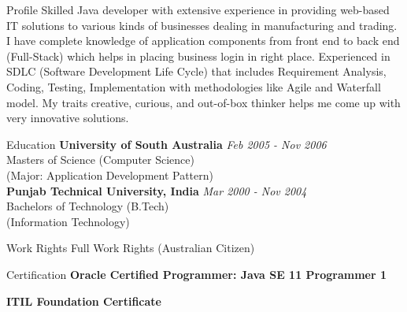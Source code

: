 \documentclass{resume}
\begin{document}
\begin{rSection}{Profile}
Skilled Java developer with extensive experience in providing web-based IT solutions to various kinds of businesses dealing in manufacturing and trading. I have complete knowledge of application components from front end to back end (Full-Stack) which helps in placing business login in right place. Experienced in SDLC (Software Development Life Cycle) that includes Requirement Analysis, Coding, Testing, Implementation with methodologies like Agile and Waterfall model. My traits creative, curious, and out-of-box thinker helps me come up with very innovative solutions. 
\end{rSection}

\begin{rSection}{Education}
{\bf University of South Australia} \hfill {\em  Feb 2005 - Nov 2006} 
\\ Masters of Science (Computer Science)
\\(Major: Application Development Pattern)\\

{\bf Punjab Technical University, India} \hfill {\em  Mar 2000 - Nov 2004} 
\\ Bachelors of Technology (B.Tech)
\\ (Information Technology)

\end{rSection}

\begin{rSection}{Work Rights}
Full Work Rights (Australian Citizen)

\end{rSection}

\begin{rSection}{Certification}
{\bf Oracle Certified Programmer: Java SE 11 Programmer 1} 

{\bf ITIL Foundation Certificate} 

\end{rSection}
\end{document}

